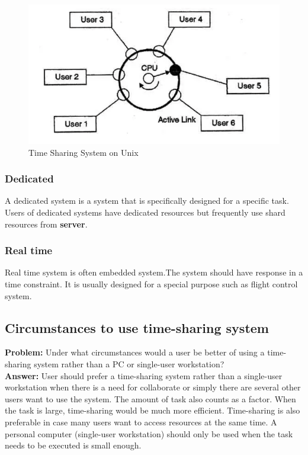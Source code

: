 \documentclass[a4paper]{article}
\begin{document}
\begin{figure}[ht]
\centering
\includegraphics[scale=0.5]{time-sharingSystem}
\caption{Time Sharing System on Unix}
\end{figure}

\subsubsection{Dedicated}
A dedicated system is a system that is specifically designed for a specific task. Users of dedicated systems have dedicated resources but frequently use shard resources from \textbf{server}.

\subsubsection{Real time}
Real time system is often embedded system.The system should have response in a time constraint. It is usually designed for a special purpose such as flight control system.


\subsection{Circumstances to use time-sharing system}
\textbf{Problem:}
Under what circumstances would a user be better of using a time-sharing system rather than a PC or single-user workstation?\\
\textbf{Answer:}
User should prefer a time-sharing system rather than a single-user workstation when there is a need for collaborate or simply there are several other users want to use the system. The amount of task also counts as a factor. When the task is large, time-sharing would be much more efficient. Time-sharing is also preferable in case many users want to access resources at the same time.
A personal computer (single-user workstation) should only be used when the task needs to be executed is small enough.
\end{document}
